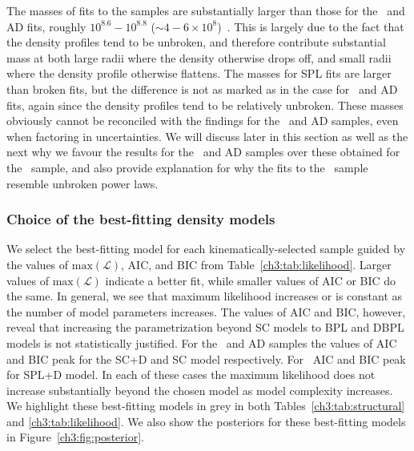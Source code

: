 The masses of fits to the \JRLz samples are substantially larger than those for the \eLz\ and AD fits, roughly $10^{8.6}-10^{8.8}$ ($\sim 4-6 \times10^{8}$)~\Msun. This is largely due to the fact that the density profiles tend to be unbroken, and therefore contribute substantial mass at both large radii where the density otherwise drops off, and small radii where the density profile otherwise flattens. The masses for SPL fits are larger than broken fits, but the difference is not as marked as in the case for \eLz\ and AD fits, again since the density profiles tend to be relatively unbroken. These masses obviously cannot be reconciled with the findings for the \eLz\ and AD samples, even when factoring in uncertainties. We will discuss later in this section as well as the next why we favour the results for the \eLz\ and AD samples over these obtained for the \JRLz\ sample, and also provide explanation for why the fits to the \JRLz\ sample resemble unbroken power laws.

\subsubsection{Choice of the best-fitting density models}

We select the best-fitting model for each kinematically-selected sample guided by the values of $\mathrm{max}(\mathcal{L})$, AIC, and BIC from Table~\ref{ch3:tab:likelihood}. Larger values of $\mathrm{max}(\mathcal{L})$ indicate a better fit, while smaller values of AIC or BIC do the same. In general, we see that maximum likelihood increases or is constant as the number of model parameters increases. The values of AIC and BIC, however, reveal that increasing the parametrization beyond SC models to BPL and DBPL models is not statistically justified. For the \eLz\ and AD samples the values of AIC and BIC peak for the SC+D and SC model respectively. For \JRLz\ AIC and BIC peak for SPL+D model. In each of these cases the maximum likelihood does not increase substantially beyond the chosen model as model complexity increases. We highlight these best-fitting models in grey in both Tables~\ref{ch3:tab:structural} and \ref{ch3:tab:likelihood}. We also show the posteriors for these best-fitting models in Figure~\ref{ch3:fig:posterior}.

